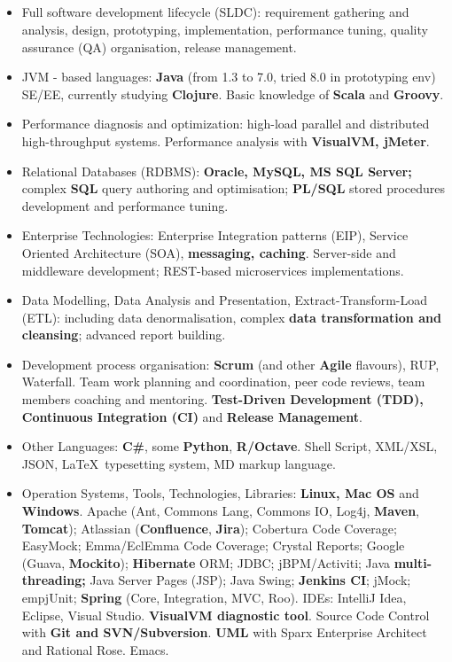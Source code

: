 \documentclass{res}
\newcommand{\osection}[1]{\section{\sc {\Large \textbf{#1}\\}} \vspace{0.30cm}}
\newcommand{\profileItem}[2]{\item {\sc #1:} #2.}
\newcommand{\emp}[1]{{\bf#1}}
\newif\ifFullVersion
\begin{document}
\begin{resume}
\osection{Technical Profile}
\vspace{0.20cm}
\begin{itemize}
  \profileItem {Full software development lifecycle (SLDC)} {requirement gathering and analysis, design, prototyping, implementation, performance tuning, quality assurance (QA) organisation, release management}
\ifFullVersion
  \profileItem {Development process organisation} {\emp{Scrum} (and other \emp{Agile} flavours), RUP, Waterfall. Team work planning and coordination, peer code reviews, team members coaching and mentoring. \emp{Continuous Integration (CI)} and \emp{Release Management}}
\fi
  \profileItem {JVM - based languages} {\emp{Java} (from 1.3 to 7.0, tried 8.0 in prototyping env) SE/EE, currently studying \emp{Clojure}. Basic knowledge of \emp{Scala} and \emp{Groovy}}
  \profileItem{Performance diagnosis and optimization} {high-load parallel and distributed high-throughput systems. Performance analysis with \emp{VisualVM, jMeter}}
  \profileItem {Relational Databases (RDBMS)} {\emp{Oracle, MySQL, MS SQL Server;} complex \emp{SQL} query authoring and optimisation; \emp{PL/SQL} stored procedures development and performance tuning}
  \profileItem{Enterprise Technologies} {Enterprise Integration patterns (EIP), Service Oriented Architecture (SOA), \emp{messaging, caching}. Server-side and middleware development; REST-based microservices implementations}
  \profileItem{Data Modelling, Data Analysis and Presentation, Extract-Transform-Load (ETL)} {including data denormalisation, complex \emp{data transformation and cleansing}; advanced report building}
\ifFullVersion
Strong interest in \emp{functional programming}, Data Science and Machine Learning / Business Intelligence systems.
\else
  \profileItem{Development process organisation} {\emp{Scrum} (and other \emp{Agile} flavours), RUP, Waterfall. Team work planning and coordination, peer code reviews, team members coaching and mentoring. \emp{Test-Driven Development (TDD), Continuous Integration (CI)} and \emp{Release Management}}
\fi
  \profileItem{Other Languages} {\emp{C\#}, some \emp{Python}, \emp{R/Octave}. Shell Script, XML/XSL, JSON, \LaTeX ~typesetting system, MD markup language}
  \profileItem{Operation Systems, Tools, Technologies, Libraries} {\emp{Linux, Mac OS} and \emp{Windows}. Apache (Ant, Commons Lang, Commons IO, Log4j, \emp{Maven}, \emp{Tomcat}); Atlassian (\emp{Confluence}, \emp{Jira}); Cobertura Code Coverage; EasyMock; Emma/EclEmma Code Coverage; Crystal Reports; Google (Guava, \emp{Mockito}); \emp{Hibernate} ORM; JDBC; jBPM/Activiti; Java \emp{multi-threading;} Java Server Pages (JSP); Java Swing; \emp{Jenkins CI}; jMock; emp{jUnit}; \emp{Spring} (Core, Integration, MVC, Roo). IDEs: IntelliJ Idea, Eclipse, Visual Studio. \emp{VisualVM diagnostic tool}. Source Code Control with \emp{Git and SVN/Subversion}. \emp{UML} with Sparx Enterprise Architect and Rational Rose. Emacs}


\end{itemize}
\end{resume}
\end{document}
